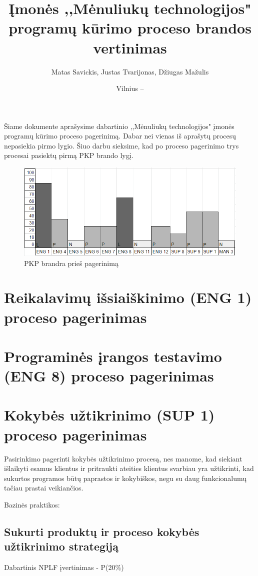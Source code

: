 \documentclass{VUMIFPSkursinis}
\title{Įmonės ,,Mėnuliukų technologijos" programų kūrimo proceso brandos vertinimas}
\author{Matas Savickis, Justas Tvarijonas, Džiugas Mažulis}
\date{Vilnius – \the\year}
\begin{document}
\maketitle

\tableofcontents

	Šiame dokumente aprašysime dabartinio ,,Mėnuliukų technologijos" įmonės programų kūrimo proceso pagerinimą. 
	Dabar nei vienas iš aprašytų procesų nepasiekia pirmo lygio.
	Šiuo darbu sieksime, kad po proceso pagerinimo trys procesai pasiektų pirmą PKP brando lygį.
	\begin{figure}[htbp]
		\includegraphics[scale=1]{img/ProcPries}
		\caption{PKP brandra prieš pagerinimą} %
		\label{img:pkpPries}
	\end{figure}

\section{Reikalavimų išsiaiškinimo (ENG 1) proceso pagerinimas}
\section{Programinės įrangos testavimo (ENG 8) proceso pagerinimas}	
\section{Kokybės užtikrinimo (SUP 1) proceso pagerinimas}
	Pasirinkimo pagerinti kokybės užtikrinimo procesą, nes manome, kad siekiant išlaikyti esamus klientus ir pritraukti ateities klientus svarbiau yra užtikrinti, 
	kad sukurtos programos būtų paprastos ir kokybiškos, negu su daug funkcionalumų tačiau prastai veikiančios.
	
	Bazinės praktikos:
		\subsection{Sukurti produktų ir proceso kokybės užtikrinimo strategiją}
			Dabartinis NPLF įvertinimas - P(20\%)
			
\end{document}
